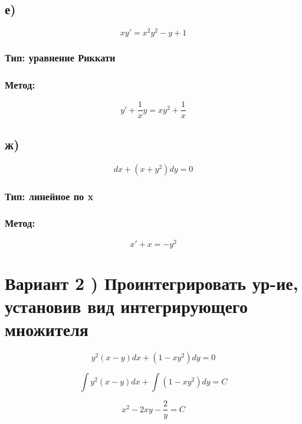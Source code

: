 \documentclass[a4paper]{article}
\begin{document}
\subsection*{е)}
\begin{equation*}
x y' = x^2 y^2 - y + 1
\end{equation*}
\subsubsection*{Тип: уравнение Риккати}

\subsubsection*{Метод:}
\begin{equation*}
y' + \frac{1}{x}y = xy^2 + \frac{1}{x}
\end{equation*}

\subsection*{ж)}
\begin{equation*}
dx + (x + y^2)dy = 0
\end{equation*}
\subsubsection*{Тип: линейное по x}

\subsubsection*{Метод:}
\begin{equation*}
x' + x = -y^2
\end{equation*}

\section*{Вариант 2 ) Проинтегрировать ур-ие, установив вид интегрирующего множителя}

\begin{equation*}
y^2(x - y)dx + (1 - xy^2)dy = 0
\end{equation*}

\begin{equation*}
\int{y^2(x - y)dx} + \int{(1 - xy^2)dy} = C
\end{equation*}

\begin{equation*}
x^2 - 2xy - \frac{2}{y} = C
\end{equation*}
\end{document}
